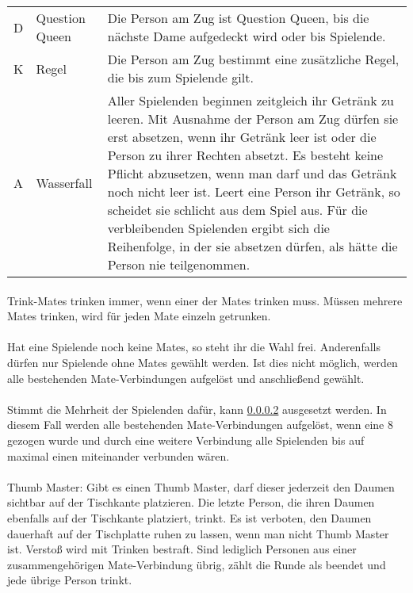 \begin{tabular}{p{1em} p{4em} p{23em}}
	D  & Question Queen & Die Person am Zug ist Question Queen, bis die nächste Dame aufgedeckt wird oder bis Spielende.                                                       \\[1ex]
	K  & Regel          & Die Person am Zug bestimmt eine zusätzliche Regel, die bis zum Spielende gilt.                                                                       \\[1ex]
	A  & Wasserfall     & Aller Spielenden beginnen zeitgleich ihr Getränk zu leeren.
	Mit Ausnahme der Person am Zug dürfen sie erst absetzen, wenn ihr Getränk leer ist oder die Person zu ihrer Rechten absetzt.
	Es besteht keine Pflicht abzusetzen, wenn man darf und das Getränk noch nicht leer ist.
	Leert eine Person ihr Getränk, so scheidet sie schlicht aus dem Spiel aus.
	Für die verbleibenden Spielenden ergibt sich die Reihenfolge, in der sie absetzen dürfen, als hätte die Person nie teilgenommen.                                           \\[1ex]
\end{tabular}

\paragraph{}
Trink-Mates trinken immer, wenn einer der Mates trinken muss.
Müssen mehrere Mates trinken, wird für jeden Mate einzeln getrunken.

\paragraph{}\label{Ring_of_Fire:Mates}
Hat eine Spielende noch keine Mates, so steht ihr die Wahl frei.
Anderenfalls dürfen nur Spielende ohne Mates gewählt werden.
Ist dies nicht möglich, werden alle bestehenden Mate-Verbindungen aufgelöst und anschließend gewählt.

\paragraph{}
Stimmt die Mehrheit der Spielenden dafür, kann \ref{Ring_of_Fire:Mates} ausgesetzt werden.
In diesem Fall werden alle bestehenden Mate-Verbindungen aufgelöst, wenn eine 8 gezogen wurde und durch eine weitere Verbindung alle Spielenden bis auf maximal einen miteinander verbunden wären.

\paragraph{}
Thumb Master: Gibt es einen Thumb Master, darf dieser jederzeit den Daumen sichtbar auf der Tischkante platzieren.
Die letzte Person, die ihren Daumen ebenfalls auf der Tischkante platziert, trinkt.
Es ist verboten, den Daumen dauerhaft auf der Tischplatte ruhen zu lassen, wenn man nicht Thumb Master ist.
Verstoß wird mit Trinken bestraft.
Sind lediglich Personen aus einer zusammengehörigen Mate-Verbindung übrig, zählt die Runde als beendet und jede übrige Person trinkt.

